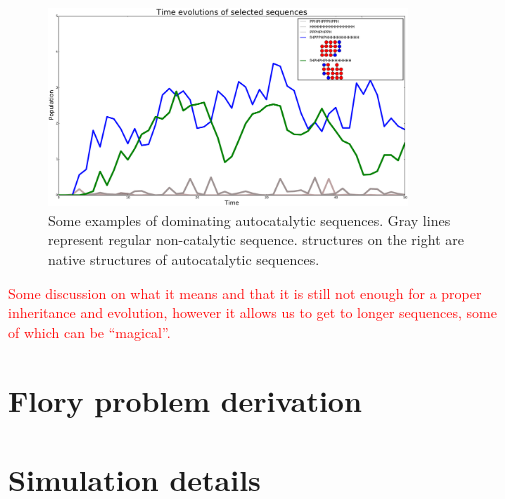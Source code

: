 \documentclass[12pt]{paper}
\newcommand{\red}[1]{\textcolor{red}{#1}}
\begin{document}
\begin{figure}[h!]
  \centering
  \includegraphics[width=0.85\textwidth]{pictures/example1.pdf} 
  \caption{Some examples of dominating autocatalytic sequences. Gray lines represent regular 
non-catalytic sequence. structures on the right are native structures of autocatalytic sequences. }
  \label{fig:example1}
\end{figure}

\red{Some discussion on what it means and that it is still not enough for a proper inheritance and 
evolution, however it allows us to get to longer sequences, some of which can be ``magical''.}



 \newpage
\appendix
\section{Flory problem derivation}\label{sec:flory-derivation}

\section{Simulation details}



 
  
\end{document}
